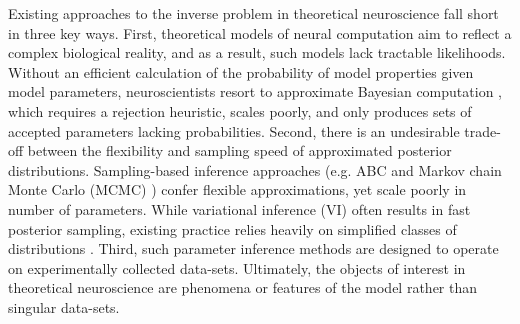 \documentclass[11pt]{article}
\begin{document}
Existing approaches to the inverse problem in theoretical neuroscience fall short in three key ways. 
First, theoretical models of neural computation aim to reflect a complex biological reality, and as a result, such models lack tractable likelihoods.
Without an efficient calculation of the probability of model properties given model parameters, neuroscientists resort to approximate Bayesian computation \cite{beaumont2002approximate, marjoram2003markov, sisson2007sequential}, which requires a rejection heuristic, scales poorly, and only produces sets of accepted parameters lacking probabilities.
Second, there is an undesirable trade-off between the flexibility and sampling speed of approximated posterior distributions.
Sampling-based inference approaches (e.g. ABC and Markov chain Monte Carlo (MCMC) \cite{hastings1970monte, metropolis1953equation}) confer flexible approximations, yet scale poorly in number of parameters.
While variational inference (VI) \cite{saul1998mean} often results in fast posterior sampling, existing practice relies heavily on simplified classes of distributions \cite{rezende2015variational}.  
Third, such parameter inference methods are designed to operate on experimentally collected data-sets.
Ultimately, the objects of interest in theoretical neuroscience are phenomena or features of the model rather than singular data-sets.

\end{document}
